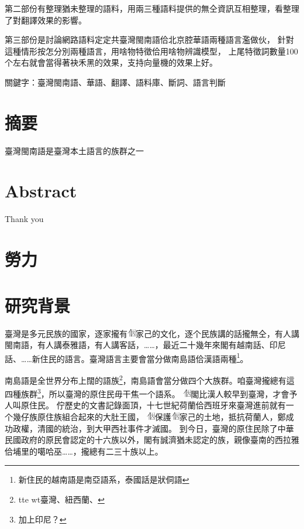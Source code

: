 \documentclass[final,oneside,onecolumn,12pt,a4paper]{book}%
\begin{document}
第二部份有整理猶未整理的語料，用兩三種語料提供的無仝資訊互相整理，看整理了對翻譯效果的影響。

第三部份是討論網路語料定定共臺灣閩南語佮北京腔華語兩種語言濫做伙，
針對這種情形按怎分別兩種語言，用啥物特徵佮用啥物辨識模型，
上尾特徵詞數量100个左右就會當得著袂禾黑的效果，支持向量機的效果上好。

關鍵字：臺灣閩南語、華語、翻譯、語料庫、斷詞、語言判斷
\newpage

\chapter{摘要}
臺灣閩南語是臺灣本土語言的族群之一

\newpage

\chapter{Abstract}

Thank you

\newpage

\chapter{勞力}

\newpage

\tableofcontents
\listoffigures
\listoftables

\mainmatter

\chapter{研究背景}
\label{章：研究背景}

臺灣是多元民族的國家，逐家攏有\includegraphics[height=1em]{字/⿰因}家己的文化，逐个民族講的話攏無仝，有人講閩南語，有人講泰雅語，有人講客話，……，最近二十幾年來閣有越南話、印尼話、……新住民的語言。臺灣語言主要會當分做南島語佮漢語兩種\footnote{新住民的越南語是南亞語系，泰國話是狀侗語}。

南島語是全世界分布上闊的語族\footnote{tte wt臺灣、紐西蘭、}，南島語會當分做四个大族群\cite{李壬癸}。咱臺灣攏總有這四種族群\footnote{加上印尼？}，所以臺灣的原住民毋干焦一个語系。
\includegraphics[height=1em]{字/⿰因}閣比漢人較早到臺灣，才會予人叫原住民。
佇歷史的文書記錄面頂，十七世紀荷蘭佮西班牙來臺灣進前就有一个幾仔族原住族組合起來的大肚王國\cite{大肚王國}，
\includegraphics[height=1em]{字/⿰因}保護\includegraphics[height=1em]{字/⿰因}家己的土地，抵抗荷蘭人，鄭成功政權，清國的統治，到大甲西社事件才滅國。
到今日，臺灣的原住民除了中華民國政府的原民會認定的十六族以外，閣有誠濟猶未認定的族，親像臺南的西拉雅佮埔里的噶哈巫……，攏總有二三十族以上。
\end{document}
